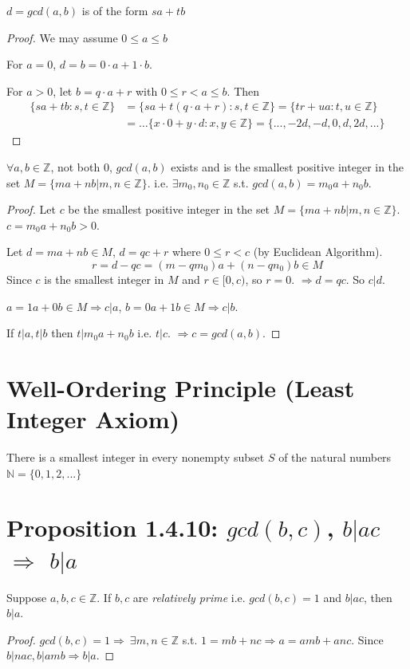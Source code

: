 \documentclass[11pt]{elegantbook}
\begin{document}
\begin{theorem}
    $d = gcd(a, b)$ is of the form $sa + tb$
\end{theorem}
\begin{proof}

We may assume $0\leq a\leq b$

For $a=0$, $d=b=0\cdot a+1\cdot b$.

For $a>0$, let $b=q\cdot a+r$ with $0\leq r<a\leq b$. Then
\begin{equation}
    \begin{aligned}
        \{sa+tb:s,t\in \mathbb{Z}\}&=\{sa+t(q\cdot a+r):s,t\in \mathbb{Z}\}=\{tr+ua: t,u\in \mathbb{Z}\}\\
        &=\dots \{x\cdot 0+y\cdot d: x,y\in \mathbb{Z}\}=\{...,-2d,-d,0,d,2d,...\}
    \end{aligned}
    \nonumber
\end{equation}
\end{proof}

\begin{proposition}
    $\forall a,b\in\mathbb{Z}$, not both 0, $gcd(a,b)$ exists and is the smallest positive integer in the set $M=\{ma+nb|m,n\in\mathbb{Z}\}$. i.e. $\exists m_0,n_0\in\mathbb{Z}$ s.t. $gcd(a,b)=m_0a+n_0b$.
\end{proposition}

\begin{proof}

Let $c$ be the smallest positive integer in the set $M=\{ma+nb|m,n\in\mathbb{Z}\}$. $c=m_0 a+n_0 b>0$.

Let $d=ma+nb\in M$, $d=qc+r$ where $0\leq r<c$ (by Euclidean Algorithm).
$$r=d-qc=(m-qm_0)a+(n-qn_0)b\in M$$
Since $c$ is the smallest integer in $M$ and $r\in[0,c)$, so $r=0$. $\Rightarrow d=qc$. So $c|d$.

$a=1a+0b\in M\Rightarrow c|a$, $b=0a+1b\in M\Rightarrow c|b$.

If $t|a,t|b$ then $t|m_0 a+n_0 b \text{ i.e. } t|c$. $\Rightarrow c=gcd(a,b)$.
\end{proof}

\section{Well-Ordering Principle (Least Integer Axiom)}
There is a smallest integer in every nonempty subset $S$ of the natural numbers $\mathbb{N}=\{0,1,2,...\}$

\section{Proposition 1.4.10: $gcd(b,c)$, $b|ac$ $\Rightarrow$ $b|a$}
\begin{proposition}[Proposition 1.4.10]
    Suppose $a,b,c\in\mathbb{Z}$. If $b,c$ are \textit{relatively prime} i.e. $gcd(b,c)=1$ and $b|ac$, then $b|a$.
\end{proposition}
\begin{proof}
$gcd(b,c)=1\Rightarrow\ \exists m,n\in\mathbb{Z}$ s.t. $1=mb+nc \Rightarrow a=amb+anc$. Since $b|nac, b|amb\Rightarrow b|a$.
\end{proof}
\end{document}
